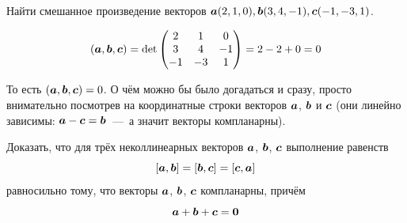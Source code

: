 \documentclass[a4paper,12pt]{article}
\begin{document}
  
  \begin{problem}[3.19(3)]
    Найти смешанное произведение векторов $\boldsymbol a(2, 1, 0), \boldsymbol b(3, 4, -1), \boldsymbol c(-1, -3, 1)$.
  \end{problem}

  \begin{solution}
    \[
      (\boldsymbol a, \boldsymbol b, \boldsymbol c) = \det\begin{pmatrix}
        2 & 1 & 0\\
        3 & 4 & -1\\
        -1 & -3 & 1
      \end{pmatrix}
      = 2 - 2 + 0 = 0
    \]
    
    То есть $(\bds a, \bds b, \bds c) \hm= 0$.
    О чём можно бы было догадаться и сразу, просто внимательно посмотрев на координатные строки векторов $\boldsymbol a$, $\boldsymbol b$ и $\boldsymbol c$ (они линейно зависимы: $\bds a \hm- \bds c \hm= \bds b$~---~а значит векторы компланарны).
  \end{solution}
  
  
  \begin{problem}[3.12]
    Доказать, что для трёх неколлинеарных векторов $\boldsymbol a$, $\boldsymbol b$, $\boldsymbol c$ выполнение равенств
    \[
      [\boldsymbol a, \boldsymbol b] = [\boldsymbol b, \boldsymbol c] = [\boldsymbol c, \boldsymbol a]
    \]
    равносильно тому, что векторы $\boldsymbol a$, $\boldsymbol b$, $\boldsymbol c$ компланарны, причём
    \[
      \boldsymbol a + \boldsymbol b + \boldsymbol c = \boldsymbol 0
    \]
  \end{problem}
  
\end{document}
